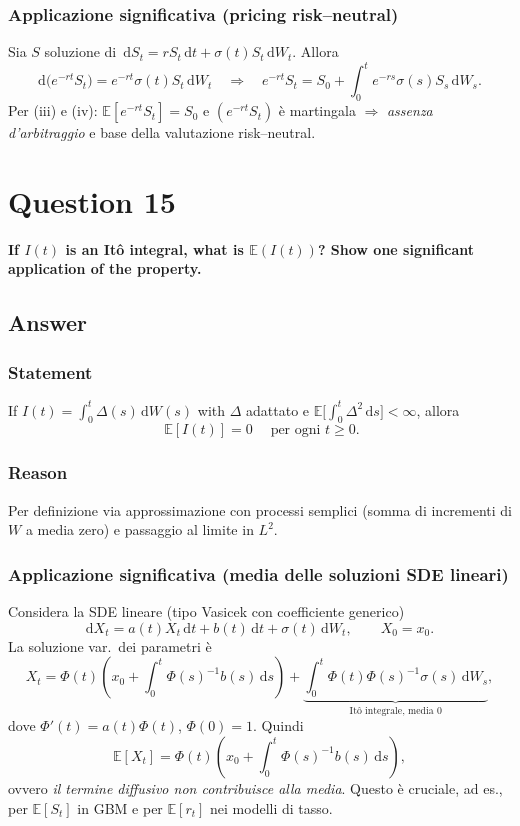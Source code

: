 \documentclass[12pt,a4paper]{book}
\theoremstyle{remark}
\newcommand{\EE}{\mathbb{E}}          %
\newcommand{\dd}{\mathrm{d}}
\begin{document}
\subsubsection*{Applicazione significativa (pricing risk–neutral)}
Sia $S$ soluzione di $\,\dd S_t = r S_t\,\dd t + \sigma(t) S_t\,\dd W_t.$ Allora
\[
\dd\big(e^{-rt}S_t\big)= e^{-rt}\sigma(t)S_t\,\dd W_t
\quad\Rightarrow\quad
e^{-rt}S_t = S_0 + \int_0^t e^{-rs}\sigma(s)S_s\,\dd W_s.
\]
Per (iii) e (iv): $\EE[e^{-rt}S_t]=S_0$ e $(e^{-rt}S_t)$ è martingala $\Rightarrow$ \emph{assenza d’arbitraggio} e base della valutazione risk–neutral.









\newpage
\section{Question 15}
\textbf{If $I(t)$ is an It\^o integral, what is $\EE(I(t))$? Show one significant application of the property.}

\subsection*{Answer}

\subsubsection*{Statement}
If $I(t)=\displaystyle \int_0^t \Delta(s)\,\dd W(s)$ with $\Delta$ adattato e $\EE\!\big[\int_0^t \Delta^2\,\dd s\big]<\infty$, allora
\[
\boxed{\;\EE[I(t)]=0\;}\quad \text{per ogni } t\ge 0.
\]

\subsubsection*{Reason}
Per definizione via approssimazione con processi semplici (somma di incrementi di $W$ a media zero) e passaggio al limite in $L^2$.

\subsubsection*{Applicazione significativa (media delle soluzioni SDE lineari)}
Considera la SDE lineare (tipo Vasicek con coefficiente generico)
\[
\dd X_t = a(t)X_t\,\dd t + b(t)\,\dd t + \sigma(t)\,\dd W_t,\qquad X_0=x_0.
\]
La soluzione var.\ dei parametri \`e
\[
X_t = \Phi(t)\!\left(x_0 + \int_0^t \Phi(s)^{-1} b(s)\,\dd s\right)
+ \underbrace{\int_0^t \Phi(t)\Phi(s)^{-1}\sigma(s)\,\dd W_s}_{\text{It\^o integrale, media 0}},
\]
dove $\Phi'(t)=a(t)\Phi(t)$, $\Phi(0)=1$. Quindi
\[
\EE[X_t]= \Phi(t)\!\left(x_0 + \int_0^t \Phi(s)^{-1} b(s)\,\dd s\right),
\]
ovvero \emph{il termine diffusivo non contribuisce alla media}. Questo \`e cruciale, ad es., per $\EE[S_t]$ in GBM e per $\EE[r_t]$ nei modelli di tasso.
\end{document}
